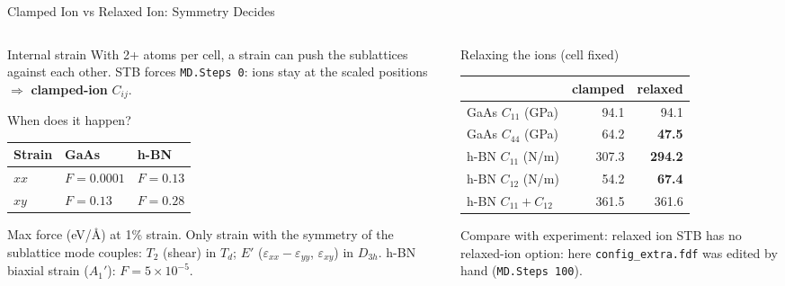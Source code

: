 \documentclass[8pt]{beamer}
\begin{document}
\begin{frame}{Clamped Ion vs Relaxed Ion: Symmetry Decides}
	\begin{columns}[T]
		\begin{column}{0.50\textwidth}
			\begin{block}{Internal strain}
				With 2+ atoms per cell, a strain can push the sublattices against each other.
				STB forces \texttt{MD.Steps 0}: ions stay at the scaled positions
				$\Rightarrow$ \textbf{clamped-ion} $C_{ij}$.
			\end{block}
			\begin{block}{When does it happen?}
				\small
				\begin{tabular}{lll}
					\toprule
					Strain & GaAs & h-BN \\
					\midrule
					$xx$ & $F = 0.0001$ & $F = 0.13$ \\
					$xy$ & $F = 0.13$ & $F = 0.28$ \\
					\bottomrule
				\end{tabular}
				\par{\scriptsize Max force (eV/\AA) at 1\% strain.
				Only strain with the symmetry of the sublattice mode couples:
				$T_2$ (shear) in $T_d$; $E'$ ($\varepsilon_{xx}-\varepsilon_{yy}$,
				$\varepsilon_{xy}$) in $D_{3h}$. h-BN biaxial strain ($A_1'$):
				$F = 5\times10^{-5}$.}
			\end{block}
		\end{column}
		\begin{column}{0.46\textwidth}
			\begin{block}{Relaxing the ions (cell fixed)}
				\centering\small
				\begin{tabular}{lrr}
					\toprule
					& clamped & relaxed \\
					\midrule
					GaAs $C_{11}$ (GPa) & 94.1 & 94.1 \\
					GaAs $C_{44}$ (GPa) & 64.2 & \textbf{47.5} \\
					\midrule
					h-BN $C_{11}$ (N/m) & 307.3 & \textbf{294.2} \\
					h-BN $C_{12}$ (N/m) & 54.2 & \textbf{67.4} \\
					h-BN $C_{11}+C_{12}$ & 361.5 & 361.6 \\
					\bottomrule
				\end{tabular}
			\end{block}
			\begin{alertblock}{Compare with experiment: relaxed ion}
				STB has no relaxed-ion option: here \texttt{config\_extra.fdf} was
				edited by hand (\texttt{MD.Steps 100}).
			\end{alertblock}
		\end{column}
	\end{columns}
\end{frame}
\end{document}
